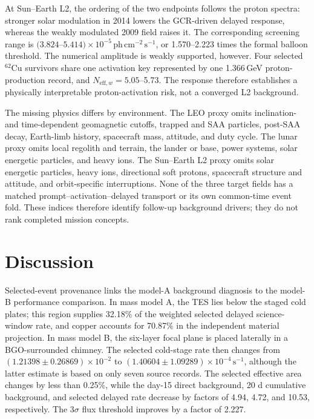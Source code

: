 \documentclass[11pt]{article}
\newcommand{\phcms}{\ensuremath{\,\mathrm{ph\,cm^{-2}\,s^{-1}}}}
\newcommand{\cps}{\ensuremath{\,\mathrm{s^{-1}}}}
\begin{document}
At Sun--Earth L2, the ordering of the two endpoints follows the proton spectra:
stronger solar modulation in 2014 lowers the GCR-driven delayed response,
whereas the weakly modulated 2009 field raises it. The corresponding screening
range is $(3.824$--$5.414)\times10^{-5}\phcms$, or 1.570--2.223 times the
formal balloon threshold. The numerical amplitude is weakly supported,
however. Four selected $^{62}$Cu survivors share one activation key represented
by one 1.366\,GeV proton-production record, and
$N_{\mathrm{eff},w}=5.05$--5.73. The response therefore establishes a
physically interpretable proton-activation risk, not a converged L2
background.

The missing physics differs by environment. The LEO proxy omits
inclination- and time-dependent geomagnetic cutoffs, trapped and SAA particles,
post-SAA decay, Earth-limb history, spacecraft mass, attitude, and duty cycle.
The lunar proxy omits local regolith and terrain, the lander or base, power
systems, solar energetic particles, and heavy ions. The Sun--Earth L2 proxy
omits solar energetic particles, heavy ions, directional soft protons,
spacecraft structure and attitude, and orbit-specific interruptions. None of
the three target fields has a matched prompt--activation--delayed transport or
its own common-time event fold. These indices therefore identify follow-up
background drivers; they do not rank completed mission concepts.

\FloatBarrier

\section{Discussion}
\label{sec:discussion}

Selected-event provenance links the model-A background diagnosis to the
model-B performance comparison. In mass model A, the TES lies below the staged cold
plates; this region supplies 32.18\% of the weighted selected delayed science-window
rate, and copper accounts for 70.87\% in the independent material projection. In
mass model B, the six-layer focal plane is placed laterally in a BGO-surrounded
chimney. The selected cold-stage rate then changes from
$(1.21398\pm0.26869)\times10^{-2}$ to
$(1.40604\pm1.09289)\times10^{-4}\cps$, although the latter estimate is based on
only seven source records. The selected effective area changes by less than
0.25\%, while the day-15 direct background, 20 d cumulative background, and
selected delayed rate decrease by factors of 4.94, 4.72, and 10.53,
respectively. The $3\sigma$ flux threshold improves by a factor of
2.227.
\end{document}
